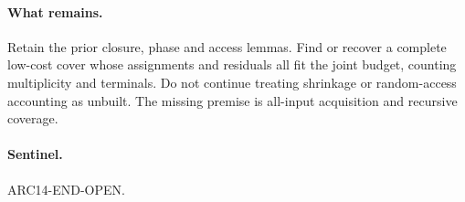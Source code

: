 \documentclass{article}
\begin{document}
\paragraph{What remains.}
Retain the prior closure, phase and access lemmas.
Find or recover a complete low-cost cover whose assignments and residuals
all fit the joint budget, counting multiplicity and terminals.
Do not continue treating shrinkage or random-access accounting as unbuilt.
The missing premise is all-input acquisition and recursive coverage.
\paragraph{Sentinel.} ARC14-END-OPEN.
\end{document}

